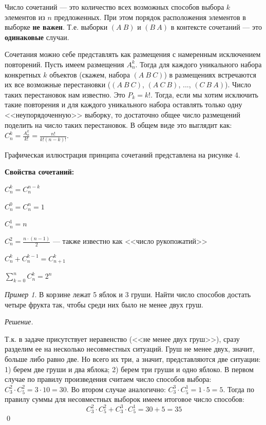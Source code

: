 \documentclass[12pt,a4paper]{article}
\newcommand{\deglistwithtitle}[2]{%
    \noindent\textbf{#1}\par\vspace{0.3em}
    \begin{deglist}
        #2
    \end{deglist}
}
\theoremstyle{definition}
\theoremstyle{definition}
\theoremstyle{remark}
\theoremstyle{corollary}
\newcommand{\nextblock}{\vspace{1.5em}\noindent}
\theoremstyle{bolditalic}
\newtheorem{example}{Пример}[section]
\newenvironment{solution}{
    \vspace{0.5em}
    \noindent\textit{Решение.}
}{\qed\vspace{1em}}
\begin{document}
Число сочетаний --- это количество всех возможных способов выбора $k$ элементов из $n$ предложенных. При этом порядок расположения элементов в выборке \textbf{не важен}. Т.е. выборки $(A\ B)$ и $(B\ A)$ в контексте сочетаний --- это \textbf{одинаковые} случаи.

\nextblock

Сочетания можно себе представлять как размещения с намеренным исключением повторений. Пусть имеем размещения $A_n^k$. Тогда для каждого уникального набора конкретных $k$ объектов (скажем, набора $(A\ B\ C)$) в размещениях встречаются их все возможные перестановки ($(A\ B\ C)$, $(A\ C\ B)$, ..., $(C\ B\ A)$). Число таких перестановок нам известно. Это $P_k=k!$. Тогда, если мы хотим исключить такие повторения и для каждого уникального набора оставлять только одну <<неупорядоченную>> выборку, то достаточно общее число размещений поделить на число таких перестановок. В общем виде это выглядит как: $C_n^k=\frac{A_n^k}{k!}=\frac{n!}{k!(n-k)!}$.

\nextblock

Графическая иллюстрация принципа сочетаний представлена на рисунке 4.


\deglistwithtitle{Свойства сочетаний:}{
    \item $C_n^k = C_n^{n-k}$
    \item $C_n^0 = C_n^n = 1$
    \item $C_n^1=n$
    \item $C_n^2=\frac{n\cdot(n-1)}{2}$ --- также известно как <<число рукопожатий>>
    \item $C_n^k + C_n^{k-1} = C_{n+1}^k$
    \item $\sum\limits_{k=0}^{n}{C_n^k}=2^n$
}

\nextblock

\begin{example}
    В корзине лежат 5 яблок и 3 груши. Найти число способов достать четыре фрукта так, чтобы среди них было не менее двух груш.
\end{example}
\begin{solution}
    Т.к. в задаче присутствует неравенство (<<не менее двух груш>>), сразу разделим ее на несколько несовместных ситуаций. Груш не менее двух, значит, больше либо равно две. Но всего их три, а значит, представляются две ситуации: 1) берем две груши и два яблока; 2) берем три груши и одно яблоко. В первом случае по правилу произведения считаем число способов выбора: $C_3^2\cdot C_5^2=3\cdot10=30$. Во втором случае аналогично: $C_3^3\cdot C_5^1=1\cdot5=5$. Тогда по правилу суммы для несовместных выборок имеем итоговое число способов: $$C_3^2\cdot C_5^2+ C_3^3\cdot C_5^1=30+5=35$$
\end{solution}
\end{document}
